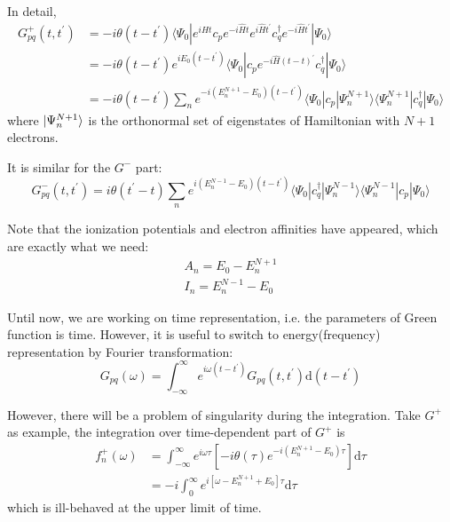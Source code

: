 In detail,
\begin{equation}
\begin{aligned}
	G_{p q}^{+}\left(t, t^{\prime}\right) 
	&=-i \theta\left(t-t^{\prime}\right)\langle\Psi_{0}|e^{i \hat{H} t} c_{p} e^{-i \hat{H} t} e^{i \hat{H} t^{\prime}} c_{q}^{\dagger} e^{-i \hat{H} t^{\prime}}| \Psi_{0}\rangle
	\\
	&=- i \theta\left(t-t^{\prime}\right) e^{i E_{0}\left(t-t^{\prime}\right)}\langle\Psi_{0}|c_{p} e^{-i \hat{H}(t-t)^{\prime}} c_{q}^{\dagger}| \Psi_{0}\rangle
	\\
	&=-i \theta\left(t-t^{\prime}\right) \sum_{n} e^{-i\left(E_{n}^{N+1}-E_{0}\right)\left(t-t^{\prime}\right)}\langle\Psi_{0}|c_{p}| \Psi_{n}^{N+1}\rangle\langle\Psi_{n}^{N+1}|c_{q}^{\dagger}| \Psi_{0}\rangle
\end{aligned}
\end{equation}
where $\ket{\Psi_n^{N+1}}$ is the orthonormal set of eigenstates of Hamiltonian with $N+1$ electrons.

It is similar for the $G^{-}$ part:
\begin{equation}
G_{p q}^{-}\left(t, t^{\prime}\right)=i \theta\left(t^{\prime}-t\right) \sum_{n} e^{i\left(E_{n}^{N-1}-E_{0}\right)\left(t-t^{\prime}\right)}\langle\Psi_{0}|c_{q}^{\dagger}| \Psi_{n}^{N-1}\rangle\langle\Psi_{n}^{N-1}|c_{p}| \Psi_{0}\rangle
\end{equation}

Note that the ionization potentials and electron affinities have appeared, which are exactly what we need:
\begin{equation}
\begin{array}{l}{A_{n}=E_{0}-E_{n}^{N+1}} \\ {I_{n}=E_{n}^{N-1}-E_{0}}\end{array}
\end{equation}

Until now, we are working on time representation, i.e. the parameters of Green function is time.
However, it is useful to switch to energy(frequency) representation by Fourier transformation:
\begin{equation}
G_{p q}(\omega)=\int_{-\infty}^{\infty} e^{i \omega\left(t-t^{\prime}\right)} G_{p q}\left(t, t^{\prime}\right) \mathrm{d}\left(t-t^{\prime}\right)
\end{equation}

However, there will be a problem of singularity during the integration.
Take $G^{+}$ as example, the integration over time-dependent part of $G^{+}$ is
\begin{equation}
\begin{aligned} f_{n}^{+}(\omega) &=\int_{-\infty}^{\infty} e^{i \omega \tau}\left[-i \theta(\tau) e^{-i\left(E_{n}^{N+1}-E_{0}\right) \tau}\right] \mathrm{d} \tau \\ &=-i \int_{0}^{\infty} e^{i\left[\omega-E_{n}^{N+1}+E_{0}\right] \tau} \mathrm{d} \tau \end{aligned}
\end{equation}
which is ill-behaved at the upper limit of time.

